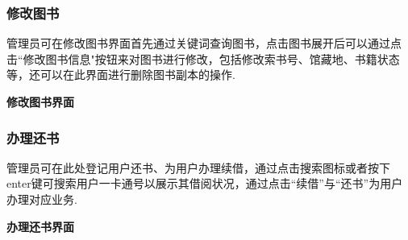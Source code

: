 \documentclass{article}
\begin{document}
\subsubsection{修改图书}
管理员可在修改图书界面首先通过关键词查询图书，点击图书展开后可以通过点击“修改图书信息"按钮来对图书进行修改，包括修改索书号、馆藏地、书籍状态等，还可以在此界面进行删除图书副本的操作.

\begin{center}
\textbf{修改图书界面}
\end{center}

\subsubsection{办理还书}
管理员可在此处登记用户还书、为用户办理续借，通过点击搜索图标或者按下enter键可搜索用户一卡通号以展示其借阅状况，通过点击“续借”与“还书”为用户办理对应业务.

\begin{center}
\textbf{办理还书界面}
\end{center}
\end{document}
